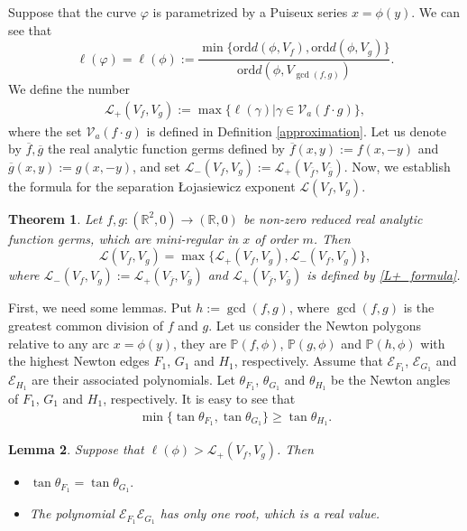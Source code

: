 \documentclass[reqno, 12pt ,a4letter]{amsart}
\newtheorem {theorem}{Theorem}[section]
\newtheorem {lemma}[theorem]{Lemma}
\theoremstyle{definition}
\begin{document}
Suppose that the curve $\varphi$ is parametrized by a Puiseux series $x= \phi(y)$. We can see that
\begin{equation}\label{lphi-separation}
	\ell(\varphi)=\ell(\phi) := \frac{ \min\{\mathrm{ord}d(\phi, V_f), \mathrm{ord}d(\phi, V_g)\} }{\mathrm{ord}d(\phi,V_{\gcd(f,g)})}.	
\end{equation} 
We define the number
\begin{align}\label{L+_formula}
   \mathscr{L}_+(V_f, V_g) := \max\{\ell(\gamma)| \gamma \in \mathcal{V}_a(f \cdot g)\},
\end{align}
where the set $\mathcal{V}_a(f \cdot g)$ is defined in Definition \ref{approximation}. Let us denote by $\overline{f}, \overline{g}$ the real analytic function germs defined by $\overline{f}(x, y) := f(x, -y)$ and $\overline{g}(x, y) := g(x, -y)$, and set $\mathscr{L}_{-}(V_f, V_g) := \mathscr{L}_{+}(V_{\overline{f}}, V_{\overline{g}})$. Now, we establish the formula for the separation \L ojasiewicz exponent $\mathscr{L}(V_f, V_g)$.
\begin{theorem}\label{separation-theorem}
	Let $f, g \colon (\mathbb{R}^2,0) \to (\mathbb{R},0)$ be non-zero reduced real analytic function germs, which are mini-regular in $x$ of order $m$. Then
	$$\mathscr{L}(V_f, V_g) = \max\{\mathscr{L}_{+}(V_f, V_g), \mathscr{L}_{-}(V_f, V_g)\},$$ where $\mathscr{L}_{-}(V_f, V_g) := \mathscr{L}_{+}(V_{\overline{f}}, V_{\overline{g}})$ and $\mathscr{L}_{+}(V_{\overline{f}}, V_{\overline{g}})$ is defined by \eqref{L+_formula}.
\end{theorem}
First, we need some lemmas. Put $h := \gcd(f,g)$, where $\gcd(f,g)$ is the greatest common division of $f$ and $g$. Let us consider the Newton polygons relative to any arc $x=\phi(y)$, they are $\mathbb{P}(f, \phi)$, $\mathbb{P}(g,\phi)$ and $\mathbb{P}(h,\phi)$ with the highest Newton edges $F_1$, $G_1$ and $H_1$, respectively. Assume that $\mathcal{E}_{F_1}$, $\mathcal{E}_{G_1}$ and $\mathcal{E}_{H_1}$ are their associated polynomials. Let $\theta_{F_1}$, $\theta_{G_1}$ and $\theta_{H_1}$ be the Newton angles of $F_1$, $G_1$ and $H_1$, respectively. It is easy to see that 
	\begin{align}\label{compare-3-tan}
		\min\{\tan\theta_{F_1}, \tan\theta_{G_1}\} \geq \tan\theta_{H_1}.
	\end{align}
	\begin{lemma}\label{claim1} 
		Suppose that $\ell(\phi) > \mathscr{L}_+(V_f, V_g)$. Then 
    \begin{itemize}
        \item[(i)] $\tan\theta_{F_1} = \tan\theta_{G_1}.$
        \item[(ii)] The polynomial $\mathcal{E}_{F_1}\mathcal{E}_{G_1}$ has only one root, which is a real value.
    \end{itemize}
		\end{lemma}
\end{document}
